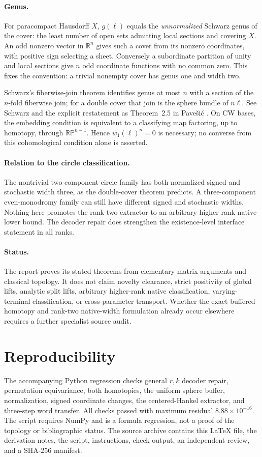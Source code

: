 \documentclass[11pt]{article}
\theoremstyle{definition}
\newcommand{\R}{\mathbb R}
\newcommand{\RP}{\mathbb {RP}}
\begin{document}
\paragraph{Genus.}
For paracompact Hausdorff $X$, $g(\ell)$ equals the \emph{unnormalized} Schwarz genus of the cover: the least number of open sets admitting local sections and covering $X$. An odd nonzero vector in $\R^n$ gives such a cover from its nonzero coordinates, with positive sign selecting a sheet. Conversely a subordinate partition of unity and local sections give $n$ odd coordinate functions with no common zero. This fixes the convention: a trivial nonempty cover has genus one and width two.

Schwarz's fiberwise-join theorem identifies genus at most $n$ with a section of the $n$-fold fiberwise join; for a double cover that join is the sphere bundle of $n\ell$. See Schwarz \cite{Schwarz} and the explicit restatement as Theorem~2.5 in Pave\v{s}i\'c \cite{Pavesic}. On CW bases, the embedding condition is equivalent to a classifying map factoring, up to homotopy, through $\RP^{n-1}$. Hence $w_1(\ell)^n=0$ is necessary; no converse from this cohomological condition alone is asserted.

\paragraph{Relation to the circle classification.}
The nontrivial two-component circle family has both normalized signed and stochastic width three, as the double-cover theorem predicts. A three-component even-monodromy family can still have different signed and stochastic widths. Nothing here promotes the rank-two extractor to an arbitrary higher-rank native lower bound. The decoder repair does strengthen the existence-level interface statement in all ranks.

\paragraph{Status.}
The report proves its stated theorems from elementary matrix arguments and classical topology. It does not claim novelty clearance, strict positivity of global lifts, analytic split lifts, arbitrary higher-rank native classification, varying-terminal classification, or cross-parameter transport. Whether the exact buffered homotopy and rank-two native-width formulation already occur elsewhere requires a further specialist source audit.

\section{Reproducibility}
The accompanying Python regression checks general $r,k$ decoder repair, permutation equivariance, both homotopies, the uniform sphere buffer, normalization, signed coordinate changes, the centered-Hankel extractor, and three-step word transfer. All checks passed with maximum residual $8.88\times10^{-16}$. The script requires NumPy and is a formula regression, not a proof of the topology or bibliographic status. The source archive contains this \LaTeX{} file, the derivation notes, the script, instructions, check output, an independent review, and a SHA-256 manifest.
\end{document}
